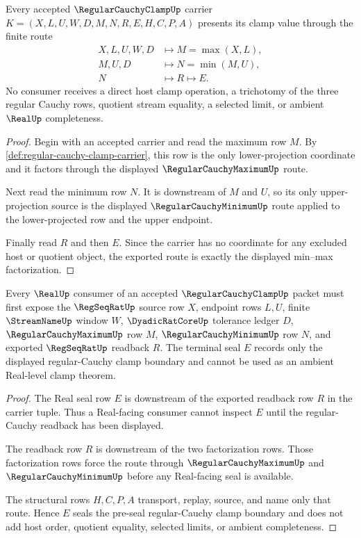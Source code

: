 \begin{theorem}
\label{thm:regular-cauchy-clamp-min-max-factorization}
Every accepted $\RegularCauchyClampUp$ carrier $K=(X,L,U,W,D,M,N,R,E,H,C,P,A)$ presents its clamp value through the finite route
$$
\begin{aligned}
X,L,U,W,D
&\longmapsto M=\max(X,L),\\
M,U,D
&\longmapsto N=\min(M,U),\\
N
&\longmapsto R \longmapsto E .
\end{aligned}
$$
No consumer receives a direct host clamp operation, a trichotomy of the three regular Cauchy rows, quotient stream equality, a selected limit, or ambient $\RealUp$ completeness.
\end{theorem}
\begin{proof}
Begin with an accepted carrier and read the maximum row $M$. By \autoref{def:regular-cauchy-clamp-carrier}, this row is the only lower-projection coordinate and it factors through the displayed $\RegularCauchyMaximumUp$ route.

Next read the minimum row $N$. It is downstream of $M$ and $U$, so its only upper-projection source is the displayed $\RegularCauchyMinimumUp$ route applied to the lower-projected row and the upper endpoint.

Finally read $R$ and then $E$. Since the carrier has no coordinate for any excluded host or quotient object, the exported route is exactly the displayed min--max factorization.
\end{proof}

\begin{theorem}
\label{thm:regular-cauchy-clamp-real-seal-boundary}
Every $\RealUp$ consumer of an accepted $\RegularCauchyClampUp$ packet must first expose the $\RegSeqRatUp$ source row $X$, endpoint rows $L,U$, finite $\StreamNameUp$ window $W$, $\DyadicRatCoreUp$ tolerance ledger $D$, $\RegularCauchyMaximumUp$ row $M$, $\RegularCauchyMinimumUp$ row $N$, and exported $\RegSeqRatUp$ readback $R$. The terminal seal $E$ records only the displayed regular-Cauchy clamp boundary and cannot be used as an ambient Real-level clamp theorem.
\end{theorem}
\begin{proof}
The Real seal row $E$ is downstream of the exported readback row $R$ in the carrier tuple. Thus a Real-facing consumer cannot inspect $E$ until the regular-Cauchy readback has been displayed.

The readback row $R$ is downstream of the two factorization rows. Those factorization rows force the route through $\RegularCauchyMaximumUp$ and $\RegularCauchyMinimumUp$ before any Real-facing seal is available.

The structural rows $H,C,P,A$ transport, replay, source, and name only that route. Hence $E$ seals the pre-seal regular-Cauchy clamp boundary and does not add host order, quotient equality, selected limits, or ambient completeness.
\end{proof}

